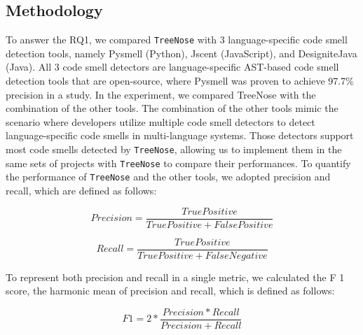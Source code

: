 


\subsection{Methodology}
\label{sec:methodology}

To answer the RQ1, we compared \texttt{TreeNose} with 3 language-specific code smell detection tools, namely Pysmell \cite{Pysmell}
(Python), Jscent \cite{Jscent} (JavaScript), and DesigniteJava \cite{DesigniteJava} (Java).
All 3 code smell detectors are language-specific AST-based code smell detection tools 
that are open-source, where Pysmell was proven to achieve 97.7\% precision in a study.
In the experiment, we compared TreeNose with the combination of the other tools.
The combination of the other tools mimic the scenario where developers utilize multiple code smell detectors to detect language-specific code smells in multi-language systems.
Those detectors support most code smells detected by \texttt{TreeNose}, allowing us to implement them in the same sets of projects with \texttt{TreeNose} to compare their performances.
To quantify the performance of \texttt{TreeNose} and the other tools, we adopted precision and recall, which are defined as follows:


\begin{equation}
    Precision = \frac{True Positive}{True Positive + False Positive}
\end{equation}

\begin{equation}
    Recall = \frac{True Positive}{True Positive + False Negative}
\end{equation}

To represent both precision and recall in a single metric, we calculated the F 1 score, the harmonic mean of precision and recall, which is defined as follows:

\begin{equation}
    F1 = 2 * \frac{Precision * Recall}{Precision + Recall}
\end{equation}

